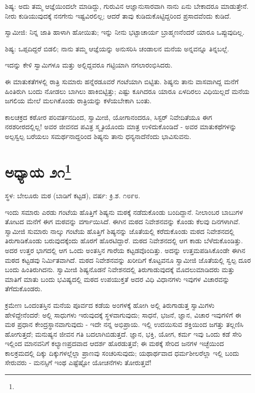 ಶಿಷ್ಯ: ಅದು ತಮ್ಮ ಆಜ್ಞೆಯಿಂದಲೇ ಮಾಡಿದ್ದು, ಗುರುವಿನ ಆಜ್ಞಾನುಸಾರವಾಗಿ ನಾನು ಏನು ಬೇಕಾದರೂ ಮಾಡುತ್ತೇನೆ. ನೀರು ಕುಡಿಯುವುದಕ್ಕೆ ನನಗೇನು ಇಷ್ಟವಿರಲಿಲ್ಲ; ಆದರೆ ತಾವು ಕುಡಿದುಕೊಟ್ಟಿದ್ದರಿಂದ ಪ್ರಸಾದವೆಂದು ಕುಡಿದೆ.

ಸ್ವಾಮೀಜಿ: ನಿನ್ನ ಜಾತಿ ಹಾಳಾಗಿ ಹೋಯಿತು; ಇನ್ನು ನೀನು ಭಟ್ಟಾಚಾರ್ಯ ಬ್ರಾಹ್ಮಣನೆಂದರೆ ಯಾರೂ ಒಪ್ಪುವುದಿಲ್ಲ.

ಶಿಷ್ಯ: ಒಪ್ಪದಿದ್ದರೆ ಬಿಡಲಿ; ನಾನು ತಮ್ಮ ಆಜ್ಞೆಯನ್ನು ಅನುಸರಿಸಿ ಚಂಡಾಲನ ಮನೆಯ ಅನ್ನವನ್ನೂ ತಿನ್ನಬಲ್ಲೆ.

ಇದನ್ನು ಕೇಳಿ ಸ್ವಾಮಿಗಳೂ ಮತ್ತು ಅಲ್ಲಿದ್ದವರೂ ಗಟ್ಟಿಯಾಗಿ ನಗಲಾರಂಭಿಸಿದರು.

ಈ ಮಾತುಕತೆಗಳಲ್ಲಿ ರಾತ್ರಿ ಸುಮಾರು ಹನ್ನೆರಡೂವರೆ ಗಂಟೆಯಾಗಿ ಬಿಟ್ಟಿತು. ಶಿಷ್ಯನು ತಾನು ವಾಸವಾಗಿದ್ದ ಮನೆಗೆ ಹಿಂತಿರುಗಿ ಬಂದು ನೋಡಲು ಬಾಗಿಲು ಹಾಕಿಬಿಟ್ಟಿತ್ತು; ಎಷ್ಟು ಕೂಗಿದರೂ ಯಾರೂ ಏಳದಿರಲು ವಿಧಿಯಿಲ್ಲದೆ ಮನೆಯ ಜಗಲಿಯ ಮೇಲೆ ಮಲಗಿಕೊಂಡು ರಾತ್ರಿಯನ್ನು ಕಳೆಯಬೇಕಾಗಿ ಬಂತು.

ಕಾಲಚಕ್ರದ ಕಠೋರ ಪರಿವರ್ತನದಿಂದ, ಸ್ವಾಮೀಜಿ, ಯೋಗಾನಂದರೂ, ಸಿಸ್ಟರ್ ನಿವೇದಿತೆಯೂ ಈಗ ನರಶರೀರದಲ್ಲಿಲ್ಲ! ಅವರ ಜೀವನದ ಪವಿತ್ರ ಸ್ಮೃತಿಯೊಂದು ಮಾತ್ರ ಉಳಿದುಕೊಂಡಿದೆ - ಅವರ ಮಾತುಕಥೆಗಳನ್ನು ಅಲ್ಪಸ್ವಲ್ಪ ಬರೆಯಲು ಸಮರ್ಥನಾದ್ದರಿಂದ ಶಿಷ್ಯನು ತಾನು ಧನ್ಯನಾದೆನೆಂದು ಭಾವಿಸುವನು.

\newpage

\chapter[ಅಧ್ಯಾಯ ೨೧]{ಅಧ್ಯಾಯ ೨೧\protect\footnote{}}

\centerline{ಸ್ಥಳ: ಬೇಲೂರು ಮಠ (ಬಾಡಿಗೆ ಕಟ್ಟಡ), ವರ್ಷ: ಕ್ರಿ.ಶ. ೧೮೯೮.}

ಇಂದು ಸಮಾರು ಎರಡು ಗಂಟೆಯ ಹೊತ್ತಿಗೆ ಶಿಷ್ಯನು ಮಠಕ್ಕೆ ನಡೆದುಕೊಂಡು ಬಂದಿದ್ದಾನೆ. ನೀಲಾಂಬರ ಬಾಬುಗಳ ತೋಟದ ಮನೆಗೆ ಈಗ ಮಠವನ್ನು ವರ್ಗಾಯಿಸಿದೆ. ಈಗಿನ ಮಠದ ನಿವೇಶನವನ್ನು ಕೊಂಡು ಕೆಲವು ದಿನಗಳಾಗಿವೆ. ಸ್ವಾಮೀಜಿ ಸುಮಾರು ನಾಲ್ಕು ಗಂಟೆಯ ಹೊತ್ತಿಗೆ ಶಿಷ್ಯನನ್ನು ಜೊತೆಯಲ್ಲಿ ಕರೆದುಕೊಂಡು ಮಠದ ನಿವೇಶನದಲ್ಲಿ ತಿರುಗಾಡಿಕೊಂಡು ಬರುವುದಕ್ಕೆಂದು ಹೊರಗೆ ಹೊರಟಿದ್ದಾರೆ. ಮಠದ ನಿವೇಶನದಲ್ಲಿ ಆಗ ಕಾಡು ಬೆಳೆದುಕೊಂಡಿತ್ತು. ಅದರ ಉತ್ತರ ಭಾಗದಲ್ಲಿ ಆಗ ಒಂದು ಅಂತಸ್ತಿನ ಗಾರೆಯ ಕಟ್ಟಡವೊಂದಿತ್ತು. ಅದನ್ನು ಉತ್ತಮಪಡಿಸಿಕೊಂಡೇ ಈಗಿನ ಮಠದ ಕಟ್ಟಡವು ನಿರ್ಮಿತವಾಗಿದೆ. ಮಠದ ನಿವೇಶನವನ್ನು ಖರೀದಿಗೆ ಕೊಟ್ಟವನೂ ಸ್ವಾಮೀಜಿ ಜೊತೆಯಲ್ಲಿ ಸ್ವಲ್ಪ ದೂರ ಬಂದು ಹಿಂತಿರುಗಿದನು. ಸ್ವಾಮೀಜಿ ಶಿಷ್ಯನೊಡನೆ ನಿವೇಶನದಲ್ಲಿ ತಿರುಗಾಡುವುದಕ್ಕೆ ಮೊದಲುಮಾಡಿದರು ಮತ್ತು ಮಾತಿಗೆ ಮಾತು ಬಂದು ಭವಿಷ್ಯದಲ್ಲಿ ಮಠದ ಉಪಯುಕ್ತತೆ ಅದರ ವಿಧಿ ವಿಧಾನಗಳು ಇವುಗಳ ವಿಚಾರವನ್ನು ತೆಗೆದುಕೊಂಡರು.

ಕ್ರಮೇಣ ಒಂದಂತಸ್ತಿನ ಮನೆಯ ಪೂರ್ವದ ಕಡೆಯ ಅಂಗಳಕ್ಕೆ ಹೋಗಿ ಅಲ್ಲಿ ತಿರುಗಾಡುತ್ತ ಸ್ವಾಮಿಗಳು ಹೇಳಿದ್ದೇನೆಂದರೆ: ಅಲ್ಲಿ ಸಾಧುಗಳು ಇರುವುದಕ್ಕೆ ಸ್ಥಳವಾಗುವುದು; ಸಾಧನೆ, ಭಜನೆ, ಜ್ಞಾನ, ವಿಚಾರ ಇವುಗಳಿಗೆ ಈ ಮಠ ಪ್ರಧಾನ ಕೇಂದ್ರಸ್ಥಾನವಾಗುವುದು - ಇದೇ ನನ್ನ ಅಭಿಪ್ರಾಯ. ಇಲ್ಲಿ ಉದಯಿಸುವ ಶಕ್ತಿಯಿಂದ ಜಗತ್ತು ತಲ್ಲಣಿಸಿ ಹೋಗುತ್ತದೆ; ಮನುಷ್ಯನ ಜೀವನ ಗತಿ ಬದಲಾಗಿಬಿಡುತ್ತದೆ. ಜ್ಞಾನ, ಭಕ್ತಿ, ಯೋಗ, ಕರ್ಮ ಇವು ಒಂದು ಕಡೆ ಸೇರಿ ಇಲ್ಲಿಂದ ಮಾನವನಿಗೆ ಕಲ್ಯಾಣಪ್ರದವಾದ ಆದರ್ಶ ಹೊರಡುತ್ತವೆ; ಈ ಮಠಕ್ಕೆ ಸೇರಿದ ಜನಗಳ ಇಚ್ಛೆಯಿಂದ ಕಾಲಕ್ರಮದಲ್ಲಿ ದಿಕ್ಕು ದಿಕ್ಕುಗಳಲ್ಲೆಲ್ಲಾ ಪ್ರಾಣವು ಸಂಚರಿಸುವುದು; ಯಥಾರ್ಥವಾದ ಧರ್ಮಶೀಲರೆಲ್ಲಾ ಇಲ್ಲಿ ಬಂದು ಸೇರುವರು - ಮನಸ್ಸಿಗೆ ಇಂಥ ಎಷ್ಟೆಷ್ಟೋ ಯೋಚನೆಗಳು ತೋರುತ್ತವೆ!

